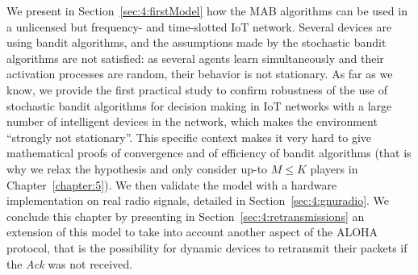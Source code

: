 
We present in Section~\ref{sec:4:firstModel} how the MAB algorithms can be used in a unlicensed but frequency- and time-slotted IoT network.
Several devices are using bandit algorithms, and the assumptions made by the stochastic bandit algorithms are not satisfied: as several agents learn simultaneously and their activation processes are random, their behavior is not stationary.
As far as we know, we provide the first practical study to confirm robustness of the use of stochastic bandit algorithms for decision making in IoT networks with a large number of intelligent devices in the network, which makes the environment ``strongly not stationary''.
This specific context makes it very hard to give mathematical proofs of convergence and of efficiency of bandit algorithms (that is why we relax the hypothesis and only consider up-to $M \leq K$ players in Chapter~\ref{chapter:5}).
We then validate the model with a hardware implementation on real radio signals, detailed in Section~\ref{sec:4:gnuradio}.
%
We conclude this chapter by presenting in Section~\ref{sec:4:retransmissions} an extension of this model to take into account another aspect of the ALOHA protocol, that is the possibility for dynamic devices to retransmit their packets if the \emph{Ack} was not received.


